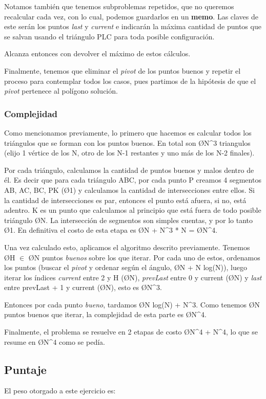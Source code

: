 Notamos también que tenemos subproblemas repetidos, que no queremos recalcular cada vez, con lo cual, podemos guardarlos en un \textbf{memo}. Las claves de este serán los puntos \textit{last} y \textit{current} e indicarán la máxima cantidad de puntos que se salvan usando el triángulo PLC para toda posible configuración.

Alcanza entonces con devolver el máximo de estos cálculos.

Finalmente, tenemos que eliminar el \textit{pivot} de los puntos buenos y repetir el proceso para contemplar todos los casos, pues partimos de la hipótesis de que el \textit{pivot} pertenece al polígono solución.

\subsubsection{Complejidad}
Como mencionamos previamente, lo primero que hacemos es calcular todos los triángulos que se forman con los puntos buenos. En total son \O{N^3} triangulos (elijo 1 vértice de los N, otro de los N-1 restantes y uno más de los N-2 finales).

Por cada triángulo, calculamos la cantidad de puntos buenos y malos dentro de él. Es decir que para cada triángulo ABC, por cada punto P creamos 4 segmentos AB, AC, BC, PK (\O{1}) y calculamos la cantidad de intersecciones entre ellos. Si la cantidad de intersecciones es par, entonces el punto está afuera, si no, está adentro. K es un punto que calculamos al principio que está fuera de todo posible triángulo \O{N}. La intersección de segmentos son simples cuentas, y por lo tanto \O{1}. En definitiva el costo de esta etapa es \O{N + N^3 * N} = \O{N^4}.

Una vez calculado esto, aplicamos el algoritmo descrito previamente. Tenemos \O{H} $\in$ \O{N} puntos \textit{buenos} sobre los que iterar. Por cada uno de estos, ordenamos los puntos (buscar el \textit{pivot} y ordenar según el ángulo, \O{N + N log(N)}), luego iterar los índices \textit{current} entre 2 y H (\O{N}), \textit{prevLast} entre 0 y current (\O{N}) y \textit{last} entre prevLast + 1 y current (\O{N}), esto es \O{N^3}.

Entonces por cada punto \textit{bueno}, tardamos \O{N log(N) + N^3}. Como tenemos \O{N} puntos buenos que iterar, la complejidad de esta parte es \O{N^4}.

Finalmente, el problema se resuelve en 2 etapas de costo \O{N^4 + N^4}, lo que se resume en \O{N^4} como se pedía.

\subsection{Puntaje}
El peso otorgado a este ejercicio es:
